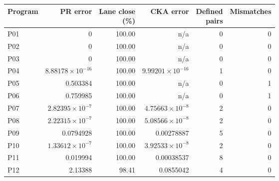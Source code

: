 \begin{center}\small
\begin{tabular}{@{}lrrrrr@{}}
\toprule
Program & PR error & \shortstack{Lane close\\(\%)} & CKA error & \shortstack{Defined\\pairs} & Mismatches \\
\midrule
P01 & 0 & 100.00 & n/a & 0 & 0 \\
P02 & 0 & 100.00 & n/a & 0 & 0 \\
P03 & 0 & 100.00 & n/a & 0 & 0 \\
P04 & $8.88178\times 10^{-16}$ & 100.00 & $9.99201\times 10^{-16}$ & 1 & 0 \\
P05 & 0.503384 & 100.00 & n/a & 0 & 1 \\
P06 & 0.759985 & 100.00 & n/a & 0 & 1 \\
P07 & $2.82395\times 10^{-7}$ & 100.00 & $4.75663\times 10^{-8}$ & 2 & 0 \\
P08 & $2.22315\times 10^{-7}$ & 100.00 & $5.08566\times 10^{-8}$ & 2 & 0 \\
P09 & 0.0794928 & 100.00 & 0.00278887 & 5 & 0 \\
P10 & $1.33612\times 10^{-7}$ & 100.00 & $3.92533\times 10^{-8}$ & 2 & 0 \\
P11 & 0.019994 & 100.00 & 0.00038537 & 8 & 0 \\
P12 & 2.13388 & 98.41 & 0.0855042 & 4 & 0 \\
\bottomrule
\end{tabular}
\end{center}
